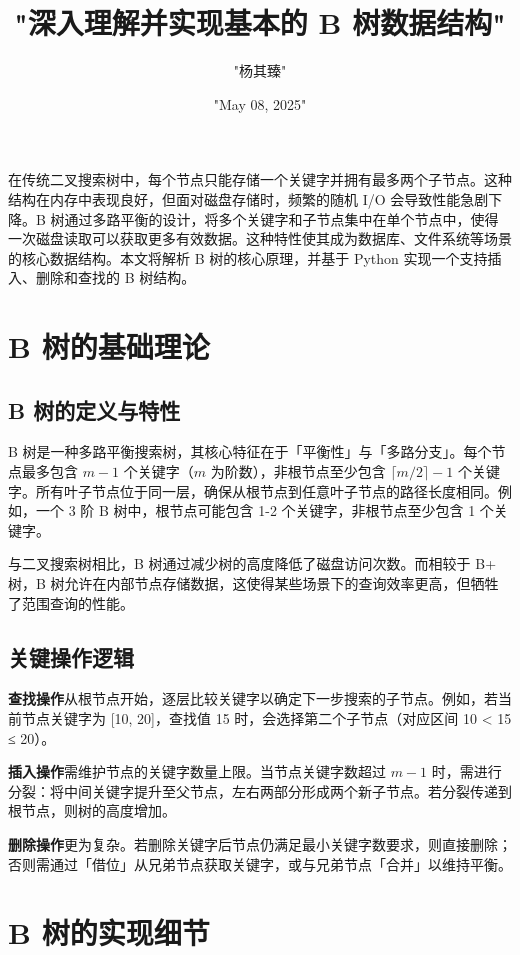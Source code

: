 \title{"深入理解并实现基本的 B 树数据结构"}
\author{"杨其臻"}
\date{"May 08, 2025"}
\maketitle
在传统二叉搜索树中，每个节点只能存储一个关键字并拥有最多两个子节点。这种结构在内存中表现良好，但面对磁盘存储时，频繁的随机 I/O 会导致性能急剧下降。B 树通过多路平衡的设计，将多个关键字和子节点集中在单个节点中，使得一次磁盘读取可以获取更多有效数据。这种特性使其成为数据库、文件系统等场景的核心数据结构。本文将解析 B 树的核心原理，并基于 Python 实现一个支持插入、删除和查找的 B 树结构。\par
\chapter{B 树的基础理论}
\section{B 树的定义与特性}
B 树是一种多路平衡搜索树，其核心特征在于「平衡性」与「多路分支」。每个节点最多包含 $m-1$ 个关键字（$m$ 为阶数），非根节点至少包含 $\lceil m/2 \rceil -1$ 个关键字。所有叶子节点位于同一层，确保从根节点到任意叶子节点的路径长度相同。例如，一个 3 阶 B 树中，根节点可能包含 1-2 个关键字，非根节点至少包含 1 个关键字。\par
与二叉搜索树相比，B 树通过减少树的高度降低了磁盘访问次数。而相较于 B+ 树，B 树允许在内部节点存储数据，这使得某些场景下的查询效率更高，但牺牲了范围查询的性能。\par
\section{关键操作逻辑}
\textbf{查找操作}从根节点开始，逐层比较关键字以确定下一步搜索的子节点。例如，若当前节点关键字为 [10, 20]，查找值 15 时，会选择第二个子节点（对应区间 10 < 15 ≤ 20）。\par
\textbf{插入操作}需维护节点的关键字数量上限。当节点关键字数超过 $m-1$ 时，需进行分裂：将中间关键字提升至父节点，左右两部分形成两个新子节点。若分裂传递到根节点，则树的高度增加。\par
\textbf{删除操作}更为复杂。若删除关键字后节点仍满足最小关键字数要求，则直接删除；否则需通过「借位」从兄弟节点获取关键字，或与兄弟节点「合并」以维持平衡。\par
\chapter{B 树的实现细节}
